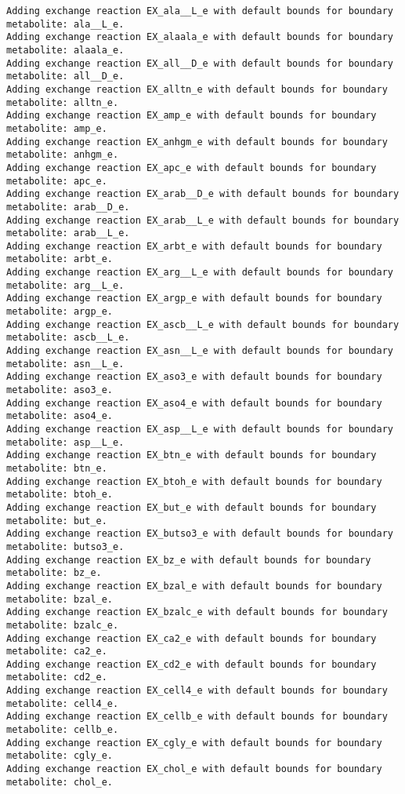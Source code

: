 \documentclass[
  letterpaper,
  DIV=11,
  numbers=noendperiod]{scrartcl}
\begin{document}
\begin{verbatim}
Adding exchange reaction EX_ala__L_e with default bounds for boundary metabolite: ala__L_e.
Adding exchange reaction EX_alaala_e with default bounds for boundary metabolite: alaala_e.
Adding exchange reaction EX_all__D_e with default bounds for boundary metabolite: all__D_e.
Adding exchange reaction EX_alltn_e with default bounds for boundary metabolite: alltn_e.
Adding exchange reaction EX_amp_e with default bounds for boundary metabolite: amp_e.
Adding exchange reaction EX_anhgm_e with default bounds for boundary metabolite: anhgm_e.
Adding exchange reaction EX_apc_e with default bounds for boundary metabolite: apc_e.
Adding exchange reaction EX_arab__D_e with default bounds for boundary metabolite: arab__D_e.
Adding exchange reaction EX_arab__L_e with default bounds for boundary metabolite: arab__L_e.
Adding exchange reaction EX_arbt_e with default bounds for boundary metabolite: arbt_e.
Adding exchange reaction EX_arg__L_e with default bounds for boundary metabolite: arg__L_e.
Adding exchange reaction EX_argp_e with default bounds for boundary metabolite: argp_e.
Adding exchange reaction EX_ascb__L_e with default bounds for boundary metabolite: ascb__L_e.
Adding exchange reaction EX_asn__L_e with default bounds for boundary metabolite: asn__L_e.
Adding exchange reaction EX_aso3_e with default bounds for boundary metabolite: aso3_e.
Adding exchange reaction EX_aso4_e with default bounds for boundary metabolite: aso4_e.
Adding exchange reaction EX_asp__L_e with default bounds for boundary metabolite: asp__L_e.
Adding exchange reaction EX_btn_e with default bounds for boundary metabolite: btn_e.
Adding exchange reaction EX_btoh_e with default bounds for boundary metabolite: btoh_e.
Adding exchange reaction EX_but_e with default bounds for boundary metabolite: but_e.
Adding exchange reaction EX_butso3_e with default bounds for boundary metabolite: butso3_e.
Adding exchange reaction EX_bz_e with default bounds for boundary metabolite: bz_e.
Adding exchange reaction EX_bzal_e with default bounds for boundary metabolite: bzal_e.
Adding exchange reaction EX_bzalc_e with default bounds for boundary metabolite: bzalc_e.
Adding exchange reaction EX_ca2_e with default bounds for boundary metabolite: ca2_e.
Adding exchange reaction EX_cd2_e with default bounds for boundary metabolite: cd2_e.
Adding exchange reaction EX_cell4_e with default bounds for boundary metabolite: cell4_e.
Adding exchange reaction EX_cellb_e with default bounds for boundary metabolite: cellb_e.
Adding exchange reaction EX_cgly_e with default bounds for boundary metabolite: cgly_e.
Adding exchange reaction EX_chol_e with default bounds for boundary metabolite: chol_e.

\end{verbatim}
\end{document}
